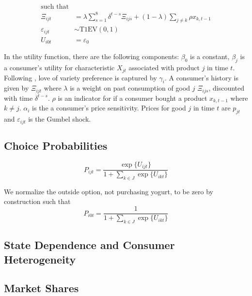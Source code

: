 \documentclass[12pt]{article}
\theoremstyle{definition}
\theoremstyle{remark}
\begin{document}
\begin{alignat*}
  \text{such that} \\
    \Xi_{ijt} &= \lambda\sum_{s=1}^{8}\delta^{t-s}\Xi_{ijs} + (1-\lambda)\sum_{j\ne k}\rho x_{k,t-1} \\
    \varepsilon_{ijt} &\sim \text{T1EV}(0,1) \\
    \text{$U_{i0t}$}&=\varepsilon_0 
\end{alignat*}

    In the utility function, there are the following components: $\beta_0$ is a constant, $\beta_j$ is a consumer's utility for characteristic $X_{jt}$ associated with product $j$ in time $t$. Following \citet{lattin_model_1987}, love of variety preference is captured by $\gamma_i$. A consumer's history is given by $\Xi_{ijt}$ where $\lambda$ is a weight on past consumption of good $j$ $\Xi_{ijs}$, discounted with time $\delta^{t-s}$. $\rho$ is an indicator for if a consumer bought a product $x_{k,t-1}$ where $k\ne j$. $\alpha_i$ is the a consumer's price sensitivity. Prices for good $j$ in time $t$ are $p_{jt}$ and $\varepsilon_{ijt}$ is the Gumbel shock.

\subsection{Choice Probabilities}

\begin{equation}
\label{eq:choice-probability}
  P_{ijt} = \frac{\exp\{U_{ijt}\}}{1+\sum_{k\in J}\exp\{U_{ikt}\}}
\end{equation}

We normalize the outside option, not purchasing yogurt, to be zero by construction such that 
\begin{equation}
  P_{i0t} = \frac{1}{1 + \sum_{k\in J}\exp\{U_{ikt}\}}
\end{equation}

\subsection{State Dependence and Consumer Heterogeneity}

\subsection{Market Shares}


\end{document}
